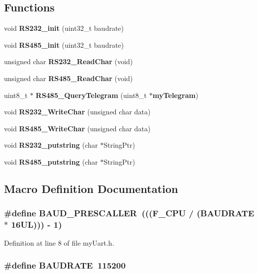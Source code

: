 \subsection*{Functions}
\begin{DoxyCompactItemize}
\item 
void {\bf R\+S232\+\_\+init} (uint32\+\_\+t baudrate)
\item 
void {\bf R\+S485\+\_\+init} (uint32\+\_\+t baudrate)
\item 
unsigned char {\bf R\+S232\+\_\+\+Read\+Char} (void)
\item 
unsigned char {\bf R\+S485\+\_\+\+Read\+Char} (void)
\item 
uint8\+\_\+t $\ast$ {\bf R\+S485\+\_\+\+Query\+Telegram} (uint8\+\_\+t $\ast${\bf my\+Telegram})
\item 
void {\bf R\+S232\+\_\+\+Write\+Char} (unsigned char data)
\item 
void {\bf R\+S485\+\_\+\+Write\+Char} (unsigned char data)
\item 
void {\bf R\+S232\+\_\+putstring} (char $\ast$String\+Ptr)
\item 
void {\bf R\+S485\+\_\+putstring} (char $\ast$String\+Ptr)
\end{DoxyCompactItemize}


\subsection{Macro Definition Documentation}
\subsubsection[{B\+A\+U\+D\+\_\+\+P\+R\+E\+S\+C\+A\+L\+L\+E\+R}]{\setlength{\rightskip}{0pt plus 5cm}\#define B\+A\+U\+D\+\_\+\+P\+R\+E\+S\+C\+A\+L\+L\+E\+R~((({\bf F\+\_\+\+C\+P\+U} / ({\bf B\+A\+U\+D\+R\+A\+T\+E} $\ast$ 16\+U\+L))) -\/ 1)}\label{my_uart_8h_a6cbe0c9e92826a80149f453e7788692e}


Definition at line 8 of file my\+Uart.\+h.

\subsubsection[{B\+A\+U\+D\+R\+A\+T\+E}]{\setlength{\rightskip}{0pt plus 5cm}\#define B\+A\+U\+D\+R\+A\+T\+E~115200}\label{my_uart_8h_a734bbab06e1a9fd2e5522db0221ff6e3}



